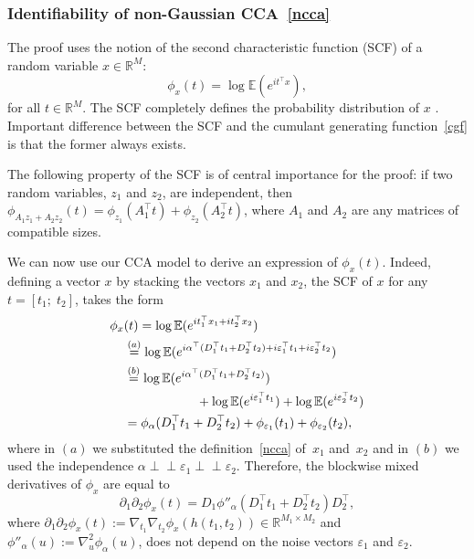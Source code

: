 \documentclass{article}
\newcommand{\R}{\mathbb{R}}
\newcommand{\ebb}{\mathbb{E}}
\newcommand{\ci}{\perp\!\!\!\perp}
\begin{document}
\subsubsection{Identifiability of non-Gaussian CCA~\eqref{ncca}}
The proof uses the notion of the second characteristic function (SCF) of a random variable $x\in\R^M$:
$$
\phi_x(t) = \log \ebb ( e^{i t^{\top} x} ),
$$
for all $t\in\R^M$.
The SCF completely defines the probability distribution of $x$ .
Important difference between the SCF and the cumulant generating function~\eqref{cgf} is that the former always exists.

The following property of the SCF is of central importance for the proof: if two random variables, $z_1$ and $z_2$, are independent, then $\phi_{A_1z_1+A_2z_2}(t) = \phi_{z_1}(A_1^{\top}t) + \phi_{z_2}(A_2^{\top}t)$, where $A_1$ and $A_2$ are any  matrices of compatible sizes.


We can now use our CCA model to derive an expression of $\phi_x(t)$.
Indeed, defining a vector $x$ by stacking the vectors $x_1$ and $x_2$, the SCF of $x$ for any $t=[t_1;\;t_2]$, takes the form
$$
\begin{aligned}
\phi_x&(t) = \log \ebb ( e^{it_1^{\top} x_1 + it_2^{\top} x_2} ) \\
&\stackrel{(a)}{=} \log \ebb ( e^{ i\alpha^{\top}(D_1^{\top} t_1 + D_2^{\top} t_2) + i \varepsilon_1^{\top} t_1 + i \varepsilon_2^{\top} t_2 } ) \\
&\stackrel{(b)}{=} \log \ebb (e^{ i \alpha^{\top} (D_1^{\top} t_1 + D_2^{\top} t_2) })  \\
& \hspace*{2cm} + \log \ebb (e^{i\varepsilon_1^{\top} t_1}) + \log \ebb (e^{i\varepsilon_2^{\top} t_2}) \\
&= \phi_{\alpha} (D_1^{\top}t_1 + D_2^{\top} t_2) + \phi_{\varepsilon_1}(t_1) + \phi_{\varepsilon_2}(t_2),
\end{aligned}
$$
where in $(a)$ we substituted the definition~\eqref{ncca} of~$x_1$ and~$x_2$ and in $(b)$ we used the independence $\alpha \ci \varepsilon_1 \ci \varepsilon_2$. Therefore, the blockwise mixed derivatives of $\phi_x$ are equal to
\begin{equation}\label{temp:hessianSCF}
 \partial_1 \partial_2 \phi_{x}(t) = D_1 \phi''_{\alpha} (D_1^{\top} t_1 + D_2^{\top} t_2) D_2^{\top},
\end{equation}
where $\partial_1 \partial_2 \phi_{x}(t) := \nabla_{t_1}\nabla_{t_2} \phi_{x}(h(t_1,t_2))\in\R^{M_1\times M_2}$ and $\phi''_{\alpha}(u) :=\nabla_u^2\phi_{\alpha}(u)$, does not depend on the noise vectors $\varepsilon_1$ and $\varepsilon_2$. 
\end{document}
